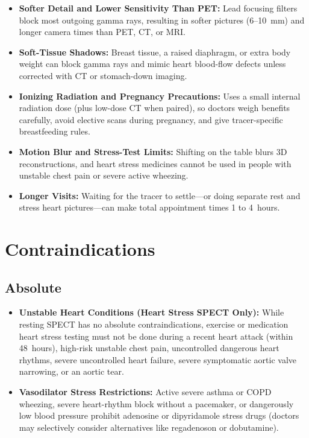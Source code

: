 \begin{itemize}
    \item \textbf{Softer Detail and Lower Sensitivity Than PET:} Lead focusing filters block most outgoing gamma rays, resulting in softer pictures (6--10~mm) and longer camera times than PET, CT, or MRI.
    \item \textbf{Soft-Tissue Shadows:} Breast tissue, a raised diaphragm, or extra body weight can block gamma rays and mimic heart blood-flow defects unless corrected with CT or stomach-down imaging.
    \item \textbf{Ionizing Radiation and Pregnancy Precautions:} Uses a small internal radiation dose (plus low-dose CT when paired), so doctors weigh benefits carefully, avoid elective scans during pregnancy, and give tracer-specific breastfeeding rules.
    \item \textbf{Motion Blur and Stress-Test Limits:} Shifting on the table blurs 3D reconstructions, and heart stress medicines cannot be used in people with unstable chest pain or severe active wheezing.
    \item \textbf{Longer Visits:} Waiting for the tracer to settle---or doing separate rest and stress heart pictures---can make total appointment times 1 to 4~hours.
\end{itemize}

\section{Contraindications}

\subsection{Absolute}

\begin{itemize}
    \item \textbf{Unstable Heart Conditions (Heart Stress SPECT Only):} While resting SPECT has no absolute contraindications, exercise or medication heart stress testing must not be done during a recent heart attack (within 48~hours), high-risk unstable chest pain, uncontrolled dangerous heart rhythms, severe uncontrolled heart failure, severe symptomatic aortic valve narrowing, or an aortic tear.
    \item \textbf{Vasodilator Stress Restrictions:} Active severe asthma or COPD wheezing, severe heart-rhythm block without a pacemaker, or dangerously low blood pressure prohibit adenosine or dipyridamole stress drugs (doctors may selectively consider alternatives like regadenoson or dobutamine).
\end{itemize}

